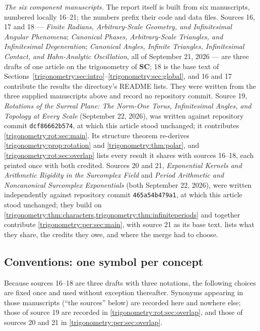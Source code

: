\documentclass[11pt,letterpaper]{article}
\numberwithin{equation}{section}
\theoremstyle{definition}
\theoremstyle{remark}
\newcommand{\SC}{\mathbf{SC}}
\begin{document}
\emph{The six component manuscripts.} The report itself is built from six manuscripts, numbered
locally 16--21; the numbers prefix their code and data files. Sources 16, 17 and 18 --- \emph{Finite
Radians, Arbitrary-Scale Geometry, and Infinitesimal Angular Phenomena}; \emph{Canonical Phases,
Arbitrary-Scale Triangles, and Infinitesimal Degeneration}; \emph{Canonical Angles, Infinite
Triangles, Infinitesimal Contact, and Hahn-Analytic Oscillation}, all of September 21, 2026 --- are
three drafts of one article on the trigonometry of $\SC$; 18 is the base text of
Sections~\ref{trigonometry:sec:intro}--\ref{trigonometry:sec:global}, and 16 and 17 contribute the results
the directory's README lists. They were written from the three supplied manuscripts above and record
no repository commit. Source 19, \emph{Rotations of the Surreal Plane: The Norm-One Torus,
Infinitesimal Angles, and Topology at Every Scale} (September 22, 2026), was written against
repository commit \texttt{dcf86662b574}, at which this article stood unchanged; it contributes
\cref{trigonometry:rot:sec:main}. Its structure theorem re-derives \cref{trigonometry:prop:rotation}
and \cref{trigonometry:thm:polar}, and \cref{trigonometry:rot:sec:overlap} lists every result it
shares with sources 16--18, each printed once with both credited. Sources 20 and 21, \emph{Exponential
Kernels and Arithmetic Rigidity in the Surcomplex Field} and \emph{Period Arithmetic and
Noncanonical Surcomplex Exponentials} (both September 22, 2026), were written independently against
repository commit \texttt{465a54b479a1}, at which this article stood unchanged; they build on
\cref{trigonometry:thm:characters,trigonometry:thm:infiniteperiods} and together contribute
\cref{trigonometry:per:sec:main}, with source 21 as its base text. 
lists what they share, the credits they owe, and where the merge had to choose.

\subsection{Conventions: one symbol per concept}\label{trigonometry:sec:conventions}
Because sources 16--18 are three drafts with three notations, the following choices are fixed once
and used without exception thereafter. Synonyms appearing in those manuscripts (``the sources''
below) are recorded here and nowhere else; those of source 19 are recorded in
\cref{trigonometry:rot:sec:overlap}, and those of sources 20 and 21 in \cref{trigonometry:per:sec:overlap}.
\end{document}
